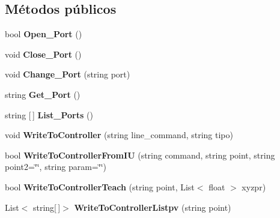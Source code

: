 \subsection*{Métodos públicos}
\begin{DoxyCompactItemize}
\item 
\mbox{\label{class_serial_controller_a034048c8c3255ce628c92cd057235213}} 
bool {\bfseries Open\+\_\+\+Port} ()
\item 
\mbox{\label{class_serial_controller_af32376d96704a7befd13ff010f70e752}} 
void {\bfseries Close\+\_\+\+Port} ()
\item 
\mbox{\label{class_serial_controller_a592468c9c1d12a261b2608b9ea1b6880}} 
void {\bfseries Change\+\_\+\+Port} (string port)
\item 
\mbox{\label{class_serial_controller_a3f88952ad282257d08f47bed4a81f754}} 
string {\bfseries Get\+\_\+\+Port} ()
\item 
\mbox{\label{class_serial_controller_a20743630ff1cbfe523cb253fa0831328}} 
string \mbox{[}$\,$\mbox{]} {\bfseries List\+\_\+\+Ports} ()
\item 
\mbox{\label{class_serial_controller_af34771a5c8dcfb653c1eb1d9247fff25}} 
void {\bfseries Write\+To\+Controller} (string line\+\_\+command, string tipo)
\item 
\mbox{\label{class_serial_controller_a50cc6305d096079c01788e4b46f3decf}} 
bool {\bfseries Write\+To\+Controller\+From\+IU} (string command, string point, string point2=\char`\"{}\char`\"{}, string param=\char`\"{}\char`\"{})
\item 
\mbox{\label{class_serial_controller_a158fcf36bb5fd21a7a43f9c0495b621b}} 
bool {\bfseries Write\+To\+Controller\+Teach} (string point, List$<$ float $>$ xyzpr)
\item 
\mbox{\label{class_serial_controller_a68d60934a79400a1171aba1fffa68768}} 
List$<$ string\mbox{[}$\,$\mbox{]}$>$ {\bfseries Write\+To\+Controller\+Listpv} (string point)
\end{DoxyCompactItemize}
